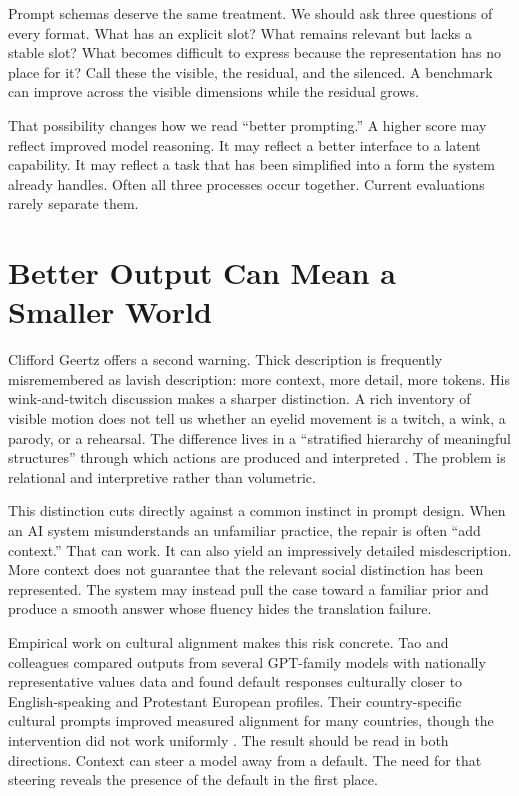 \documentclass[11pt]{article}
\begin{document}
Prompt schemas deserve the same treatment. We should ask three questions of every format. What has an explicit slot? What remains relevant but lacks a stable slot? What becomes difficult to express because the representation has no place for it? Call these the visible, the residual, and the silenced. A benchmark can improve across the visible dimensions while the residual grows.

That possibility changes how we read ``better prompting.'' A higher score may reflect improved model reasoning. It may reflect a better interface to a latent capability. It may reflect a task that has been simplified into a form the system already handles. Often all three processes occur together. Current evaluations rarely separate them.

\section{Better Output Can Mean a Smaller World}

Clifford Geertz offers a second warning. Thick description is frequently misremembered as lavish description: more context, more detail, more tokens. His wink-and-twitch discussion makes a sharper distinction. A rich inventory of visible motion does not tell us whether an eyelid movement is a twitch, a wink, a parody, or a rehearsal. The difference lives in a ``stratified hierarchy of meaningful structures'' through which actions are produced and interpreted \citep{geertz1973thick}. The problem is relational and interpretive rather than volumetric.

This distinction cuts directly against a common instinct in prompt design. When an AI system misunderstands an unfamiliar practice, the repair is often ``add context.'' That can work. It can also yield an impressively detailed misdescription. More context does not guarantee that the relevant social distinction has been represented. The system may instead pull the case toward a familiar prior and produce a smooth answer whose fluency hides the translation failure.

Empirical work on cultural alignment makes this risk concrete. Tao and colleagues compared outputs from several GPT-family models with nationally representative values data and found default responses culturally closer to English-speaking and Protestant European profiles. Their country-specific cultural prompts improved measured alignment for many countries, though the intervention did not work uniformly \citep{tao2024cultural}. The result should be read in both directions. Context can steer a model away from a default. The need for that steering reveals the presence of the default in the first place.
\end{document}

